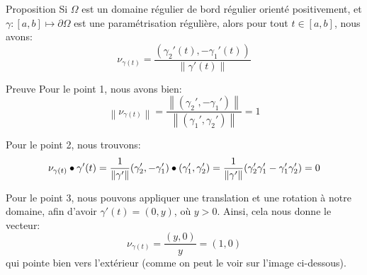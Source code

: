 \documentclass[a4paper]{article}
\begin{document}
\begin{parag}{Proposition}
    Si $\Omega$ est un domaine régulier de bord régulier orienté positivement, et $\gamma: \left[a, b\right] \mapsto \partial \Omega$ est une paramétrisation régulière, alors pour tout $t \in\left[a, b\right]$, nous avons: 
    \[\nu_{\gamma\left(t\right)} = \frac{\left(\gamma_2'\left(t\right), - \gamma_1'\left(t\right)\right)}{\left\|\gamma'\left(t\right)\right\|}\]
        
    \begin{subparag}{Preuve}
        Pour le point 1, nous avons bien: 
        \[\left\|\nu_{\gamma\left(t\right)}\right\| = \frac{\left\|\left(\gamma_2', -\gamma_1'\right)\right\|}{\left\|\left(\gamma_1', \gamma_2'\right)\right\|} = 1\]

        Pour le point 2, nous trouvons: 
        \[\nu_{\gamma\left(t\right)} \dotprod \gamma'\left(t\right) = \frac{1}{\left\|\gamma'\right\|} \left(\gamma_2', -\gamma_1'\right) \dotprod \left(\gamma_1', \gamma_2'\right) = \frac{1}{\left\|\gamma'\right\|} \left(\gamma_2' \gamma_1' - \gamma_1' \gamma_2'\right) = 0\]

        Pour le point 3, nous pouvons appliquer une translation et une rotation à notre domaine, afin d'avoir $\gamma'\left(t\right) = \left(0, y\right)$, où $y > 0$. Ainsi, cela nous donne le vecteur: 
        \[\nu_{\gamma\left(t\right)} = \frac{\left(y, 0\right)}{y} = \left(1, 0\right)\]
        qui pointe bien vers l'extérieur (comme on peut le voir sur l'image ci-dessous).

    \end{subparag}
\end{parag}
\end{document}
